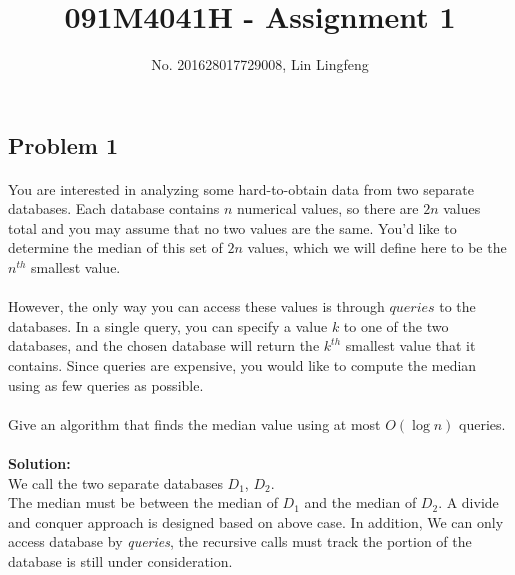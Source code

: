 \documentclass[11pt]{article}
\title{091M4041H - Assignment 1}
\author{No. 201628017729008,  Lin Lingfeng}
\begin{document}
\begin{CJK*}{UTF8}{gkai}
    \maketitle

    \section{Problem 1}

    \paragraph{} You are interested in analyzing some hard-to-obtain data from two separate databases. Each database contains $n$ numerical values, so there are $2n$ values total and you may assume that no two values are the same. You'd like to determine the median of this set of $2n$ values, which we will define here to be the $n^{th}$ smallest value.

    \paragraph{}However, the only way you can access these values is through $queries$ to the databases. In a single query, you can specify a value $k$ to one of the two databases, and the chosen database will return the $k^{th}$ smallest value that it contains. Since queries are expensive, you would like to compute the median using as few queries as possible.

    \paragraph{}Give an algorithm that finds the median value using at most $O(\log n)$ queries.

    \paragraph{}\textbf{Solution:}\\
     We call the two separate databases $D_1$, $D_2$.\\
     The median must be between the median of $D_1$ and the median of $D_2$. A divide and conquer approach is designed based on above case. In addition, We can only access database by \emph{queries}, the recursive calls must track the portion of the database is still under consideration.




\end{CJK*}
\end{document}
